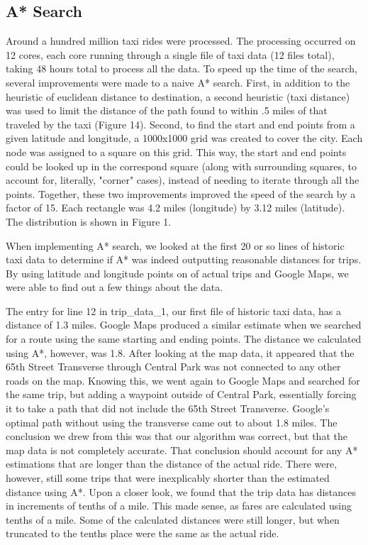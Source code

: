 \documentclass{sig-alternate}
\begin{document}
\subsection{A* Search}
Around a hundred million taxi rides were processed. The processing occurred on 12 cores, each core running through a single file of taxi data (12 files total), taking 48 hours total to process all the data. To speed up the time of the search, several improvements were made to a naive A* search. First, in addition to the heuristic of euclidean distance to destination, a second heuristic (taxi distance) was used to limit the distance of the path found to within .5 miles of that traveled by the taxi (Figure 14). Second, to find the start and end points from a given latitude and longitude, a 1000x1000 grid was created to cover the city. Each node was assigned to a square on this grid. This way, the start and end points could be looked up in the correspond square (along with surrounding squares, to account for, literally, "corner" cases), instead of needing to iterate through all the points. Together, these two improvements improved the speed of the search by a factor of 15. Each rectangle was 4.2 miles (longitude) by 3.12 miles (latitude). The distribution is shown in Figure 1.

When implementing A* search, we looked at the first 20 or so lines of historic taxi data to determine if A* was indeed outputting reasonable distances for trips.  By using latitude and longitude points on of actual trips and Google Maps, we were able to find out a few things about the data.

The entry for line 12 in trip\_data\_1, our first file of historic taxi data, has a distance of 1.3 miles.  Google Maps produced a similar estimate when we searched for a route using the same starting and ending points.  The distance we calculated using A*, however, was 1.8.  After looking at the map data, it appeared that the 65th Street Transverse through Central Park was not connected to any other roads on the map.  Knowing this, we went again to Google Maps and searched for the same trip, but adding a waypoint outside of Central Park, essentially forcing it to take a path that did not include the 65th Street Transverse. Google's optimal path without using the transverse came out to about 1.8 miles. The conclusion we drew from this was that our algorithm was correct, but that the map data is not completely accurate.  That conclusion should account for any A* estimations that are longer than the distance of the actual ride.  There were, however, still some trips that were inexplicably shorter than the estimated distance using A*.  Upon a closer look, we found that the trip data has distances in increments of tenths of a mile.  This made sense, as fares are calculated using tenths of a mile.  Some of the calculated distances were still longer, but when truncated to the tenths place were the same as the actual ride.
 
\end{document}
